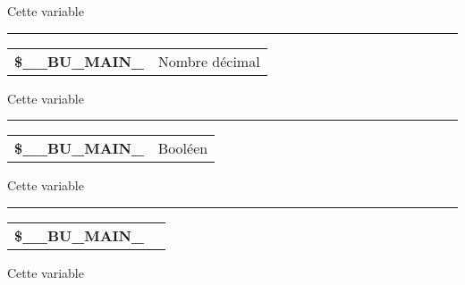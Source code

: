 \documentclass[a4paper,10pt]{article}
\begin{document}
\begin{justify}
    Cette variable
\end{justify}


\par\noindent\rule{\textwidth}{0.4pt}

\begin{justify}
    \begin{tabular}{l|l}
        \textbf{\color{vars}\$\_\_BU\_MAIN\_}  & Nombre décimal\\[1\baselineskip]
    \end{tabular}
\end{justify}

\begin{justify}
    Cette variable
\end{justify}


\par\noindent\rule{\textwidth}{0.4pt}

\begin{justify}
    \begin{tabular}{l|l}
        \textbf{\color{vars}\$\_\_BU\_MAIN\_}   & Booléen \\[1\baselineskip]
    \end{tabular}
\end{justify}

\begin{justify}
    Cette variable
\end{justify}


\par\noindent\rule{\textwidth}{0.4pt}

\begin{justify}
    \begin{tabular}{l|l}
        \textbf{\color{vars}\$\_\_BU\_MAIN\_}   & \\[1\baselineskip]
    \end{tabular}
\end{justify}

\begin{justify}
    Cette variable
\end{justify}
\end{document}

